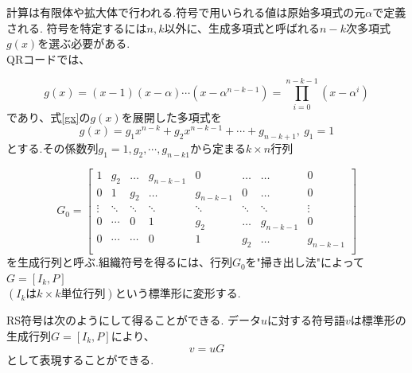 \documentclass{thesis}
\begin{document}
計算は有限体や拡大体で行われる.符号で用いられる値は原始多項式の元$\alpha$で定義される.
符号を特定するには$n,k$以外に、生成多項式\cite{Sato}と呼ばれる$n-k$次多項式$g(x)$を選ぶ必要がある.\\
QRコードでは、

\begin{equation}
 g(x)=(x-1)(x-\alpha)\cdots(x-\alpha^{n-k-1})= \prod_{i=0}^{n-k-1}(x-\alpha^i)
 \label{gx}
\end{equation}
であり、式\ref{gx}の$g(x)$を展開した多項式を
\begin{equation}
 g(x)=g_1x^{n-k}+g_2x^{n-k-1}+\cdots+g_{n-k+1},\ g_1=1
 \label{gx_ten}
\end{equation}
とする.その係数列$g_1=1,g_2,\cdots,g_{n-k1}$から定まる$k\times n$行列

\[
  G_0 = \left[
    \begin{array}{cccccccc}
      1 & g_2 & \ldots & g_{n-k-1} &       0      & \ldots  & \ldots & 0 \\
      0 &1    &    g_2  & \ldots     & g_{n-k-1}  & 0        & \ldots & 0 \\
      \vdots & \ddots & \ddots& \ddots& \ddots& \ddots& \ddots & \vdots \\
      0 & \cdots & 0 &1 & g_2 & \ldots & g_{n-k-1} &       0       \\
      0 & \cdots & \cdots & 0 &1 & g_2 & \ldots & g_{n-k-1}       \\
    \end{array}
  \right]
\]
を生成行列と呼ぶ.組織符号を得るには、行列$G_0$を"掃き出し法"によって$G=[I_k,P]$\\
$(I_kはk\times k単位行列)$という標準形に変形する.

RS符号は次のようにして得ることができる.
データ$u$に対する符号語$v$は標準形の生成行列$G=[I_k,P]$により、
\begin{equation}
 v=uG
\end{equation}
として表現することができる.




\end{document}
